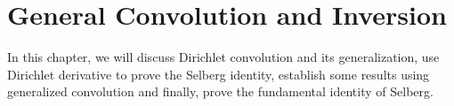 \documentclass[elemannt.tex]{subfile}
\begin{document}
    \section{General Convolution and Inversion}
    In this chapter, we will discuss Dirichlet convolution and its generalization, use Dirichlet derivative to prove the Selberg identity, establish some results using generalized convolution and finally, prove the fundamental identity of Selberg.
\end{document}

